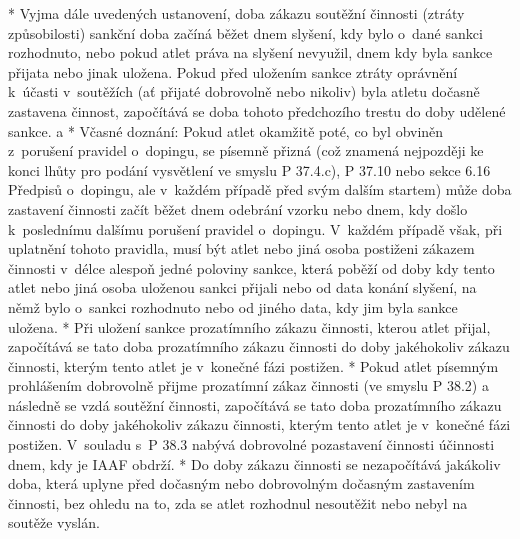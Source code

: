 * Vyjma dále uvedených ustanovení, doba zákazu soutěžní činnosti (ztráty způsobilosti) sankční doba začíná běžet dnem slyšení, kdy bylo o~dané sankci rozhodnuto, nebo pokud atlet práva na slyšení nevyužil, dnem kdy byla sankce přijata nebo jinak uložena. Pokud před uložením sankce ztráty oprávnění k~účasti v~soutěžích (ať přijaté dobrovolně nebo nikoliv) byla atletu dočasně zastavena činnost, započítává se doba tohoto předchozího trestu do doby udělené sankce.
  \begitems \style a
  * Včasné doznání: Pokud atlet okamžitě poté, co byl obviněn z~porušení pravidel o~dopingu, se písemně přizná (což znamená nejpozději ke konci lhůty pro podání vysvětlení ve smyslu P 37.4.c), P 37.10 nebo sekce 6.16 Předpisů o~dopingu, ale v~každém případě před svým dalším startem) může doba zastavení činnosti začít běžet dnem odebrání vzorku nebo dnem, kdy došlo k~poslednímu dalšímu porušení pravidel o~dopingu. V~každém případě však, při uplatnění tohoto pravidla, musí být atlet nebo jiná osoba postiženi zákazem činnosti v~délce alespoň jedné poloviny sankce, která poběží od doby kdy tento atlet nebo jiná osoba uloženou sankci přijali nebo od data konání slyšení, na němž bylo o~sankci rozhodnuto nebo od jiného data, kdy jim byla sankce uložena.
  * Při uložení sankce prozatímního zákazu činnosti, kterou atlet přijal, započítává se tato doba prozatímního zákazu činnosti do doby jakéhokoliv zákazu činnosti, kterým tento atlet je v~konečné fázi postižen.
  * Pokud atlet písemným prohlášením dobrovolně přijme prozatímní zákaz činnosti (ve smyslu P 38.2) a následně se vzdá soutěžní činnosti, započítává se tato doba prozatímního zákazu činnosti do doby jakéhokoliv zákazu činnosti, kterým tento atlet je v~konečné fázi postižen. V~souladu s~P 38.3 nabývá dobrovolné pozastavení činnosti účinnosti dnem, kdy je IAAF obdrží.
  * Do doby zákazu činnosti se nezapočítává jakákoliv doba, která uplyne před dočasným nebo dobrovolným dočasným zastavením činnosti, bez ohledu na to, zda se atlet rozhodnul nesoutěžit nebo nebyl na soutěže vyslán.
  \enditems

